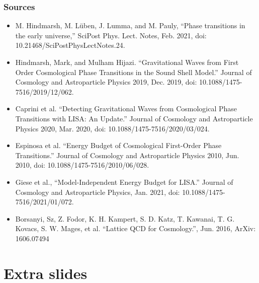 \begin{frame}
    \frametitle{Sources}
    \begin{itemize}
        \scriptsize
        \item M. Hindmarsh, M. Lüben, J. Lumma, and M. Pauly, “Phase transitions in the early universe,” SciPost Phys. Lect. Notes, Feb. 2021, doi: 10.21468/SciPostPhysLectNotes.24.
        \item Hindmarsh, Mark, and Mulham Hijazi. “Gravitational Waves from First Order Cosmological Phase Transitions in the Sound Shell Model.” Journal of Cosmology and Astroparticle Physics 2019, Dec. 2019, doi: 10.1088/1475-7516/2019/12/062.
        \item Caprini et al. “Detecting Gravitational Waves from Cosmological Phase Transitions with LISA: An Update.” Journal of Cosmology and Astroparticle Physics 2020, Mar. 2020, doi: 10.1088/1475-7516/2020/03/024.
        \item Espinosa et al. “Energy Budget of Cosmological First-Order Phase Transitions.” Journal of Cosmology and Astroparticle Physics 2010, Jun. 2010, doi: 10.1088/1475-7516/2010/06/028.
        \item Giese et al., “Model-Independent Energy Budget for LISA.” Journal of Cosmology and Astroparticle Physics, Jan. 2021, doi: 10.1088/1475-7516/2021/01/072.
        \item Borsanyi, Sz, Z. Fodor, K. H. Kampert, S. D. Katz, T. Kawanai, T. G. Kovacs, S. W. Mages, et al. “Lattice QCD for Cosmology.”, Jun. 2016, ArXiv: 1606.07494
    \end{itemize}
\end{frame}

\section*{Extra slides}

